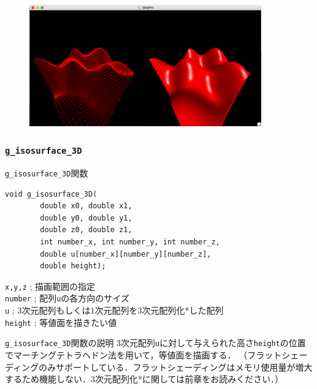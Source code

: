 \documentclass[platex,a4paper,12pt]{jsarticle}%
\begin{document}
\begin{figure}[htb]
\centering
	\includegraphics[width=100mm]{Canvas_g_bird_view.eps}
\end{figure}




\clearpage
\subsubsection{\texttt{g\_isosurface\_3D}}

\begin{itembox}[l]{\texttt{g\_isosurface\_3D}関数}
\begin{verbatim}
void g_isosurface_3D(
        double x0, double x1,
        double y0, double y1,        
        double z0, double z1,
        int number_x, int number_y, int number_z,
        double u[number_x][number_y][number_z],
        double height);
\end{verbatim}
\verb|x,y,z| ; 描画範囲の指定\\
\verb|number| ; 配列\verb|u|の各方向のサイズ\\
\verb|u| ; 3次元配列もしくは1次元配列を3次元配列化*した配列\\
\verb|height| ; 等値面を描きたい値
\end{itembox}

\begin{itembox}[l]{\texttt{g\_isosurface\_3D}関数の説明}
3次元配列\verb|u|に対して与えられた高さ\verb|height|の位置でマーチングテトラへドン法を用いて，等値面を描画する．
（フラットシェーディングのみサポートしている．フラットシェーディングはメモリ使用量が増大するため機能しない．3次元配列化*に関しては前章をお読みください．）
\end{itembox}
\end{document}
